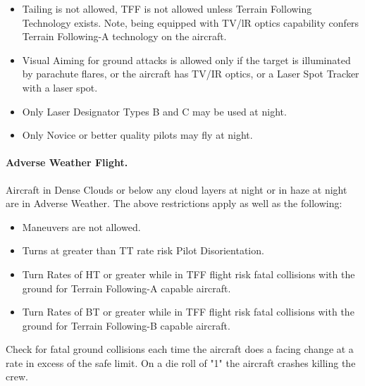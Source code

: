 \begin{advancedrules}
{\begin{itemize}
    \item Tailing is not allowed, TFF is not allowed unless Terrain Following Technology exists. Note, being equipped with TV/lR optics capability confers Terrain Following-A technology on the aircraft.

    \item Visual Aiming for ground attacks is allowed only if the target is illuminated by parachute flares, or the aircraft has TV/IR optics, or a Laser Spot Tracker with a laser spot.

    \item Only Laser Designator Types B and C may be used at night.

    \item Only Novice or better quality pilots may fly at night.

\end{itemize}

\paragraph{Adverse Weather Flight.} Aircraft in Dense Clouds or below any cloud layers at night or in haze at night are in Adverse Weather. The above restrictions apply as well as the following:

\begin{itemize}

    \item {} Maneuvers are not allowed.

    \item Turns at greater than TT rate risk Pilot Disorientation.

    \item Turn Rates of HT or greater while in TFF flight risk fatal collisions with the ground for Terrain Following-A capable aircraft.  

    \item Turn Rates of BT or greater while in TFF flight risk fatal collisions with the ground for Terrain Following-B capable aircraft.


\end{itemize}

Check for fatal ground collisions each time the aircraft does a facing change at a rate in excess of the safe limit. On a die roll of "1" the aircraft crashes killing the crew.

}
\end{advancedrules}
